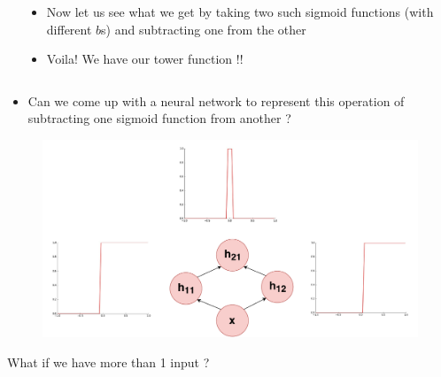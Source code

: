 \begin{frame}
	\begin{columns}
		\begin{overlayarea}{\textwidth}{\textheight}
			
		\end{overlayarea}
		\begin{overlayarea}{\textwidth}{\textheight}
			\begin{itemize}\justifying
				\item Now let us see what we get by taking two such sigmoid functions (with different $b$s) and subtracting one from the other
				\item<4-> Voila! We have our tower function !!
			\end{itemize}
		\end{overlayarea}
	\end{columns}
\end{frame}

\begin{frame}
	\begin{itemize}\justifying
		\item Can we come up with a neural network to represent this operation of subtracting one sigmoid function from another ?
	\end{itemize}
\end{frame}


\begin{frame}
	\begin{figure}
		\includegraphics[scale=0.4]{images/module5/Plots/sig_add}
	\end{figure}
\end{frame}

\begin{frame}
	What if we have more than 1 input ?
\end{frame}

